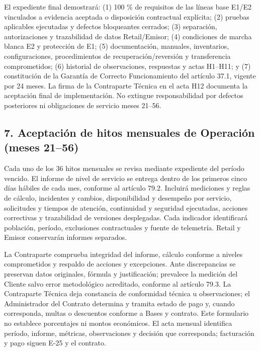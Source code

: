 \documentclass[11pt]{article}
\begin{document}
El expediente final demostrará: (1) 100 \% de requisitos de las líneas base E1/E2 vinculados a evidencia aceptada o disposición contractual explícita; (2) pruebas aplicables ejecutadas y defectos bloqueantes cerrados; (3) separación, autorizaciones y trazabilidad de datos Retail/Emisor; (4) condiciones de marcha blanca E2 y protección de E1; (5) documentación, manuales, inventarios, configuraciones, procedimientos de recuperación/reversión y transferencia comprometidos; (6) historial de observaciones, respuestas y actas H1--H11; y (7) constitución de la Garantía de Correcto Funcionamiento del artículo 37.1, vigente por 24 meses. La firma de la Contraparte Técnica en el acta H12 documenta la aceptación final de implementación. No extingue responsabilidad por defectos posteriores ni obligaciones de servicio meses 21--56.

\subsection{7. Aceptación de hitos mensuales de Operación (meses 21--56)}\label{t17-aceptaciuxf3n-de-hitos-mensuales-de-operaciuxf3n-meses-2156}

Cada uno de los 36 hitos mensuales se revisa mediante expediente del período vencido. El informe de nivel de servicio se entrega dentro de los primeros cinco días hábiles de cada mes, conforme al artículo 79.2. Incluirá mediciones y reglas de cálculo, incidentes y cambios, disponibilidad y desempeño por servicio, solicitudes y tiempos de atención, continuidad y seguridad ejecutadas, acciones correctivas y trazabilidad de versiones desplegadas. Cada indicador identificará población, período, exclusiones contractuales y fuente de telemetría. Retail y Emisor conservarán informes separados.

La Contraparte comprueba integridad del informe, cálculo conforme a niveles comprometidos y respaldo de acciones y excepciones. Ante discrepancias se preservan datos originales, fórmula y justificación; prevalece la medición del Cliente salvo error metodológico acreditado, conforme al artículo 79.3. La Contraparte Técnica deja constancia de conformidad técnica u observaciones; el Administrador del Contrato determina y tramita estado de pago y, cuando corresponda, multas o descuentos conforme a Bases y contrato. Este formulario no establece porcentajes ni montos económicos. El acta mensual identifica período, informe, métricas, observaciones y decisión que corresponda; facturación y pago siguen E-25 y el contrato.
\end{document}
